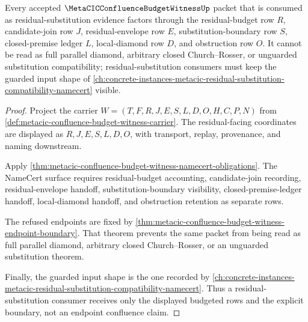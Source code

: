 \begin{theorem}
\label{thm:metacic-confluence-budget-witness-residual-coverage}
Every accepted $\MetaCICConfluenceBudgetWitnessUp$ packet that is consumed as residual-substitution evidence factors through the residual-budget row $R$, candidate-join row $J$, residual-envelope row $E$, substitution-boundary row $S$, closed-premise ledger $L$, local-diamond row $D$, and obstruction row $O$. It cannot be read as full parallel diamond, arbitrary closed Church--Rosser, or unguarded substitution compatibility; residual-substitution consumers must keep the guarded input shape of \autoref{ch:concrete-instances-metacic-residual-substitution-compatibility-namecert} visible.
\end{theorem}
\begin{proof}
Project the carrier $W=(T,F,R,J,E,S,L,D,O,H,C,P,N)$ from \autoref{def:metacic-confluence-budget-witness-carrier}. The residual-facing coordinates are displayed as $R,J,E,S,L,D,O$, with transport, replay, provenance, and naming downstream.

Apply \autoref{thm:metacic-confluence-budget-witness-namecert-obligations}. The NameCert surface requires residual-budget accounting, candidate-join recording, residual-envelope handoff, substitution-boundary visibility, closed-premise-ledger handoff, local-diamond handoff, and obstruction retention as separate rows.

The refused endpoints are fixed by \autoref{thm:metacic-confluence-budget-witness-endpoint-boundary}. That theorem prevents the same packet from being read as full parallel diamond, arbitrary closed Church--Rosser, or an unguarded substitution theorem.

Finally, the guarded input shape is the one recorded by \autoref{ch:concrete-instances-metacic-residual-substitution-compatibility-namecert}. Thus a residual-substitution consumer receives only the displayed budgeted rows and the explicit boundary, not an endpoint confluence claim.
\end{proof}




